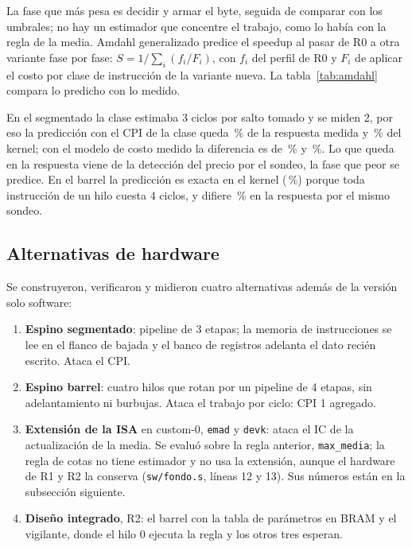 \documentclass[11pt,a4paper]{article}
\newcommand{\tablaancha}[1]{\resizebox{\linewidth}{!}{}}
\newcommand{\arch}[1]{\texttt{#1}}
\begin{document}
\begin{table}[H]\centering
\caption{Perfil del tick de la regla de cotas: R0 y el hilo 0 de R2.}\label{tab:perfil}
\tablaancha{generado/t33cperfil.tex}
\end{table}

La fase que más pesa es decidir y armar el byte, seguida de comparar con los umbrales; no hay un estimador que concentre el trabajo, como lo había con la regla de la media. Amdahl generalizado predice el speedup al pasar de R0 a otra variante fase por fase: $S = 1/\sum_i (f_i/F_i)$, con $f_i$ del perfil de R0 y $F_i$ de aplicar el costo por clase de instrucción de la variante nueva. La tabla~\ref{tab:amdahl} compara lo predicho con lo medido.

\begin{table}[H]\centering
\caption{Speedup predicho por Amdahl contra el medido, con la regla de cotas.}\label{tab:amdahl}
\tablaancha{generado/t33camdahl.tex}
\end{table}

En el segmentado la clase estimaba 3 ciclos por salto tomado y se miden 2, por eso la predicción con el CPI de la clase queda \pCotasAmdahlErrRespSegClase\,\% de la respuesta medida y \pCotasAmdahlErrKernelSegClase\,\% del kernel; con el modelo de costo medido la diferencia es de \pCotasAmdahlErrRespSeg\,\% y \pCotasAmdahlErrKernelSeg\,\%. Lo que queda en la respuesta viene de la detección del precio por el sondeo, la fase que peor se predice. En el barrel la predicción es exacta en el kernel (\pCotasAmdahlErrKernelBarrel\,\%) porque toda instrucción de un hilo cuesta 4 ciclos, y difiere \pCotasAmdahlErrRespBarrel\,\% en la respuesta por el mismo sondeo.

\subsection{Alternativas de hardware}

Se construyeron, verificaron y midieron cuatro alternativas además de la versión solo software:
\begin{enumerate}
  \item \textbf{Espino segmentado}: pipeline de 3 etapas; la memoria de instrucciones se lee en el flanco de bajada y el banco de registros adelanta el dato recién escrito. Ataca el CPI.
  \item \textbf{Espino barrel}: cuatro hilos que rotan por un pipeline de 4 etapas, sin adelantamiento ni burbujas. Ataca el trabajo por ciclo: CPI 1 agregado.
  \item \textbf{Extensión de la ISA} en custom-0, \texttt{emad} y \texttt{devk}: ataca el IC de la actualización de la media. Se evaluó sobre la regla anterior, \texttt{max\_media}; la regla de cotas no tiene estimador y no usa la extensión, aunque el hardware de R1 y R2 la conserva (\arch{sw/fondo.s}, líneas 12 y 13). Sus números están en la subsección siguiente.
  \item \textbf{Diseño integrado}, R2: el barrel con la tabla de parámetros en BRAM\ifpeldanodos{} y el vigilante\fi, donde el hilo 0 ejecuta la regla y los otros tres esperan.
\end{enumerate}
\end{document}
